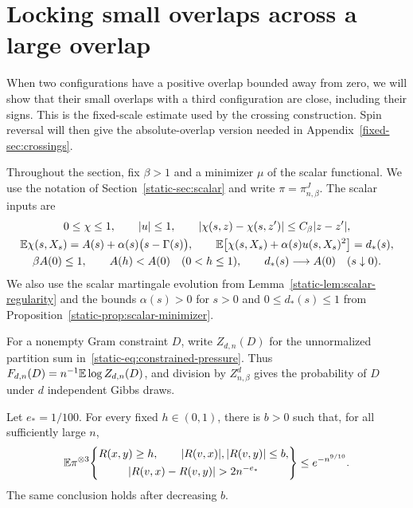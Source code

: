 \section{Locking small overlaps across a large overlap}
\label{static-sec:locking}

When two configurations have a positive overlap bounded away from zero,
we will show that their small overlaps with a third configuration are
close, including their signs. This is the fixed-scale estimate used by
the crossing construction. Spin reversal will then give the
absolute-overlap version needed in Appendix~\ref{fixed-sec:crossings}.

Throughout the section, fix $\beta>1$ and a minimizer $\mu$ of the scalar
functional. We use the notation of Section~\ref{static-sec:scalar} and
write $\pi=\pi_{n,\beta}^J$. The scalar inputs are
\begin{equation}
\label{static-eq:locking-scalar-identities}
\begin{gathered}
0\leq\chi\leq1,\qquad |u|\leq1,\qquad
|\chi(s,z)-\chi(s,z')|\leq C_\beta|z-z'|,\\
\mathbb E\chi(s,X_s)=A(s)+\alpha(s)\bigl(s-\Gamma(s)\bigr),\qquad
\mathbb E\bigl[\chi(s,X_s)+\alpha(s)u(s,X_s)^2\bigr]=d_*(s),\\
\beta A(0)\leq1,\qquad A(h)<A(0)\quad(0<h\leq1),\qquad
d_*(s)\longrightarrow A(0)\quad(s\downarrow0).
\end{gathered}
\end{equation}
We also use the scalar martingale evolution from
Lemma~\ref{static-lem:scalar-regularity} and the bounds
$\alpha(s)>0$ for $s>0$ and $0\le d_*(s)\le1$ from
Proposition~\ref{static-prop:scalar-minimizer}.

For a nonempty Gram constraint $D$, write $Z_{d,n}(D)$ for the
unnormalized partition sum in~\eqref{static-eq:constrained-pressure}.
Thus $F_{d,n}(D)=n^{-1}\mathbb E\log Z_{d,n}(D)$, and division by
$Z_{n,\beta}^d$ gives the probability of $D$ under $d$ independent
Gibbs draws.

\begin{lemma}\label{lem:fixed-locking}
Let $e_*=1/100$. For every fixed $h\in(0,1)$, there is $b>0$ such that,
for all sufficiently large $n$,
\begin{equation}\label{eq:fixed-locking}
 \E\pi^{\otimes3}\!\left\{
 \begin{gathered}
 R(x,y)\ge h,\qquad |R(v,x)|,|R(v,y)|\le b,\\
 |R(v,x)-R(v,y)|>2n^{-e_*}
 \end{gathered}\right\}\le e^{-n^{9/10}}.
\end{equation}
The same conclusion holds after decreasing $b$.
\end{lemma}

